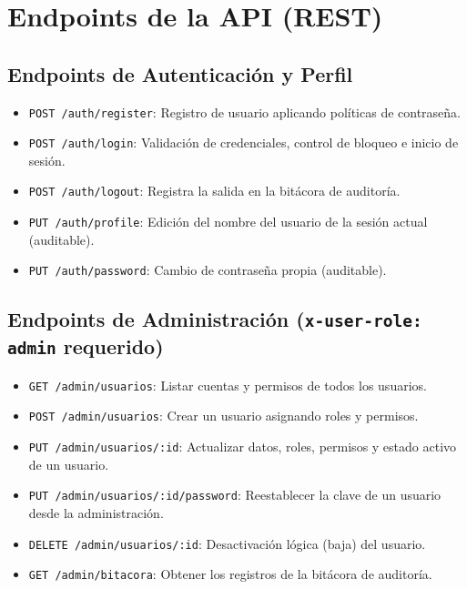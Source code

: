 \documentclass[11pt,a4paper]{article}
\begin{document}
\section{Endpoints de la API (REST)}

\subsection{Endpoints de Autenticación y Perfil}
\begin{itemize}
    \item \texttt{POST /auth/register}: Registro de usuario aplicando políticas de contraseña.
    \item \texttt{POST /auth/login}: Validación de credenciales, control de bloqueo e inicio de sesión.
    \item \texttt{POST /auth/logout}: Registra la salida en la bitácora de auditoría.
    \item \texttt{PUT /auth/profile}: Edición del nombre del usuario de la sesión actual (auditable).
    \item \texttt{PUT /auth/password}: Cambio de contraseña propia (auditable).
\end{itemize}

\subsection{Endpoints de Administración (\texttt{x-user-role: admin} requerido)}
\begin{itemize}
    \item \texttt{GET /admin/usuarios}: Listar cuentas y permisos de todos los usuarios.
    \item \texttt{POST /admin/usuarios}: Crear un usuario asignando roles y permisos.
    \item \texttt{PUT /admin/usuarios/:id}: Actualizar datos, roles, permisos y estado activo de un usuario.
    \item \texttt{PUT /admin/usuarios/:id/password}: Reestablecer la clave de un usuario desde la administración.
    \item \texttt{DELETE /admin/usuarios/:id}: Desactivación lógica (baja) del usuario.
    \item \texttt{GET /admin/bitacora}: Obtener los registros de la bitácora de auditoría.
\end{itemize}
\end{document}

